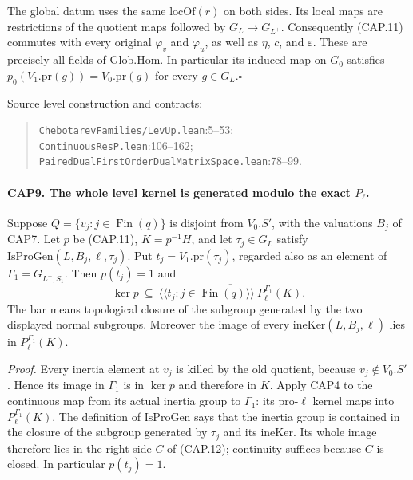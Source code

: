 The global datum uses the same $\mathrm{locOf}(r)$ on both sides.
Its local maps are restrictions of the quotient maps followed by
$G_L\to G_{L^+}$.  Consequently (CAP.11) commutes with every
original $\varphi_v$ and $\varphi_u$, as well as $\eta$, $c$, and
$\varepsilon$.  These are precisely all fields of
$\mathrm{Glob.Hom}$.  In particular its induced map on $G_0$
satisfies $p_0(V_1.\mathrm{pr}(g))=V_0.\mathrm{pr}(g)$ for
every $g\in G_L$.\hfill$\square$

Source level construction and contracts:
\begin{quote}\small
\nolinkurl{ChebotarevFamilies/LevUp.lean}:5--53;\\
\nolinkurl{ContinuousResP.lean}:106--162;\\
\nolinkurl{PairedDualFirstOrderDualMatrixSpace.lean}:78--99.
\end{quote}

\paragraph{CAP9. The whole level kernel is generated modulo the exact $P_\ell$.}
\label{claim:CAP9}
Suppose $Q=\{v_j:j\in\operatorname{Fin}(q)\}$ is disjoint from
$V_0.S'$, with the valuations $B_j$ of CAP7.  Let $p$ be (CAP.11),
$K=p^{-1}H$, and let $\tau_j\in G_L$ satisfy
$\mathrm{IsProGen}(L,B_j,\ell,\tau_j)$.  Put
$t_j=V_1.\mathrm{pr}(\tau_j)$, regarded also as an element of
$\Gamma_1=G_{L^+,S_1}$.  Then $p(t_j)=1$ and
\[
 \ker p\ \subseteq\
 \overline{\langle\!\langle t_j:j\in\operatorname{Fin}(q)\rangle\!\rangle
       \ P_\ell^{\Gamma_1}(K)}.
 \tag{CAP.12}
\]
The bar means topological closure of the subgroup generated by the two
displayed normal subgroups.  Moreover the image of every
$\mathrm{ineKer}(L,B_j,\ell)$ lies in $P_\ell^{\Gamma_1}(K)$.

\emph{Proof.}
Every inertia element at $v_j$ is killed by the old quotient, because
$v_j\notin V_0.S'$.  Hence its image in $\Gamma_1$ is in $\ker p$
and therefore in $K$.  Apply CAP4 to the continuous map from its
actual inertia group to $\Gamma_1$: its pro-$\ell$ kernel maps into
$P_\ell^{\Gamma_1}(K)$.  The definition of $\mathrm{IsProGen}$ says
that the inertia group is contained in the closure of the subgroup
generated by $\tau_j$ and its $\mathrm{ineKer}$.  Its whole image
therefore lies in the right side $C$ of (CAP.12); continuity suffices
because $C$ is closed.  In particular $p(t_j)=1$.

